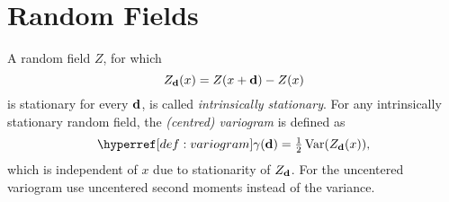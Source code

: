 \section{Random Fields}



\begin{definition}[Variogram]
	\label{def: variogram}
	A random field \(Z\), for which
	\[
		Z_{\mathbf{d}}(x) = Z(x+\mathbf{d})- Z(x)
	\]
	is stationary for every \(\mathbf{d}\), is called \emph{intrinsically stationary}.
	For any intrinsically stationary random field, the \emph{(centred) variogram} is
	defined as
	\[
		\variogram(\step)	= \tfrac12\Var(Z_\step(x)),
	\]
	which is independent of \(x\) due to stationarity of \(Z_{\mathbf{d}}\). For the
	uncentered variogram use uncentered second moments instead of the variance.
\end{definition}

